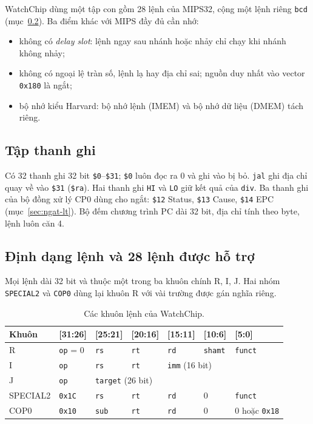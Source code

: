 WatchChip dùng một tập con gồm 28 lệnh của MIPS32, cộng một lệnh riêng \texttt{bcd} (mục~\ref{sec:lenh}). Ba điểm khác với MIPS đầy đủ cần nhớ:
\begin{itemize}
  \item không có \emph{delay slot}: lệnh ngay sau nhánh hoặc nhảy chỉ chạy khi nhánh không nhảy;
  \item không có ngoại lệ tràn số, lệnh lạ hay địa chỉ sai; nguồn duy nhất vào vector \texttt{0x180} là ngắt;
  \item bộ nhớ kiểu Harvard: bộ nhớ lệnh (IMEM) và bộ nhớ dữ liệu (DMEM) tách riêng.
\end{itemize}

\subsection{Tập thanh ghi}
Có 32 thanh ghi 32 bit \texttt{\$0}--\texttt{\$31}; \texttt{\$0} luôn đọc ra 0 và ghi vào bị bỏ. \texttt{jal} ghi địa chỉ quay về vào \texttt{\$31} (\texttt{\$ra}). Hai thanh ghi \texttt{HI} và \texttt{LO} giữ kết quả của \texttt{div}. Ba thanh ghi của bộ đồng xử lý CP0 dùng cho ngắt: \texttt{\$12} Status, \texttt{\$13} Cause, \texttt{\$14} EPC (mục~\ref{sec:ngat-lt}). Bộ đếm chương trình PC dài 32 bit, địa chỉ tính theo byte, lệnh luôn căn 4.

\subsection{Định dạng lệnh và 28 lệnh được hỗ trợ}\label{sec:lenh}
Mọi lệnh dài 32 bit và thuộc một trong ba khuôn chính R, I, J. Hai nhóm \texttt{SPECIAL2} và \texttt{COP0} dùng lại khuôn R với vài trường được gán nghĩa riêng.

\begin{table}[htbp]
\centering\small
\begin{tabular}{@{}lllllll@{}}
\toprule
Khuôn & {[}31:26{]} & {[}25:21{]} & {[}20:16{]} & {[}15:11{]} & {[}10:6{]} & {[}5:0{]} \\
\midrule
R        & \texttt{op} = 0 & \texttt{rs} & \texttt{rt} & \texttt{rd} & \texttt{shamt} & \texttt{funct} \\
I        & \texttt{op}     & \texttt{rs} & \texttt{rt} & \multicolumn{3}{l}{\texttt{imm} (16 bit)} \\
J        & \texttt{op}     & \multicolumn{5}{l}{\texttt{target} (26 bit)} \\
SPECIAL2 & \texttt{0x1C}   & \texttt{rs} & \texttt{rt} & \texttt{rd} & 0 & \texttt{funct} \\
COP0     & \texttt{0x10}   & \texttt{sub} & \texttt{rt} & \texttt{rd} & 0 & 0 hoặc \texttt{0x18} \\
\bottomrule
\end{tabular}
\caption{Các khuôn lệnh của WatchChip.}\label{tab:khuon}
\end{table}

